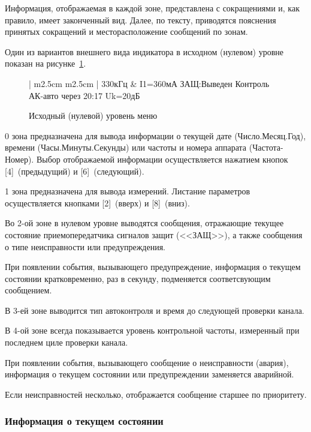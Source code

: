 Информация, отображаемая в каждой зоне, представлена с сокращениями и, как правило, имеет законченный вид. Далее, по тексту, приводятся пояснения принятых сокращений и месторасположение сообщений по зонам.

Один из вариантов внешнего вида индикатора в исходном (нулевом) уровне показан на рисунке~\ref{fig:overview_level0}. 

\begin{figure}[H]
	\centering
	
	\begin{tabular}{| m{2.5cm}  m{2.5cm} |}
		\firsthline
		330кГц	& \raggedleft I1=360мА 				\tabularnewline 
		 {ЗАЩ:Выведен Контроль}	\tabularnewline 
		 {АК-авто через 20:17}	\tabularnewline 
		 {Uk=20дБ}				\tabularnewline
		\lasthline
	\end{tabular} 
	
	\caption{Исходный (нулевой) уровень меню}
	\label{fig:overview_level0}
\end{figure}

0 зона предназначена для вывода информации о текущей дате (Число.Месяц.Год), времени (Часы.Минуты.Секунды) или частоты и номера аппарата (Частота-Номер). Выбор отображаемой информации осуществляется нажатием кнопок [4]~(предыдущий) и [6]~(следующий).

1 зона предназначена для вывода измерений. Листание параметров осуществляется кнопками [2]~(вверх) и [8]~(вниз).

Во 2-ой зоне в нулевом уровне выводятся сообщения, отражающие текущее состояние приемопередатчика сигналов защит (<<ЗАЩ>>), а также сообщения о типе неисправности или предупреждения.

При появлении события, вызывающего предупреждение, информация о текущем состоянии кратковременно, раз в секунду, подменяется соответсвующим сообщением.

В 3-ей зоне выводится тип автоконтроля и время до следующей проверки канала.

В 4-ой зоне всегда показывается уровень контрольной частоты, измеренный при последнем циле проверки канала.

При появлении события, вызывающего сообщение о неисправности (авария), информация о текущем состоянии или предупреждении заменяется аварийной.

Если неисправностей несколько, отображается сообщение старшее по приоритету.


\subsubsection{Информация о текущем состоянии}


